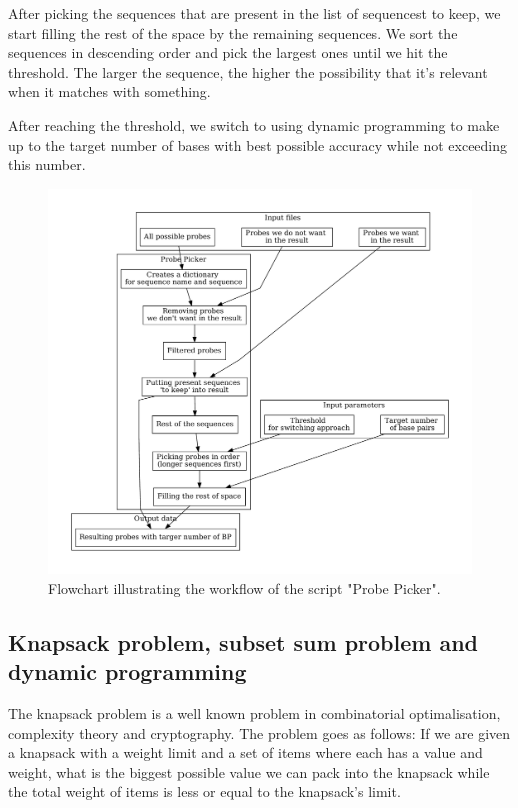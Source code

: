 After picking the sequences that are present in the list of sequencest to keep, we start filling the rest of the space by the remaining sequences. We sort the 
sequences in descending order and pick the largest ones until we hit the threshold. The larger the sequence, the higher the possibility that it's relevant 
when it matches with something. 

After reaching the threshold, we switch to using dynamic programming to make up to the target number of bases with best possible accuracy while not exceeding this 
number. 

\begin{figure}
\centerline{
	\includegraphics[width=1\textwidth]{graphs/probe_picker_workflow}
}
\caption[Workflow of Probe Picker script]{Flowchart illustrating the workflow of the script "Probe Picker".}
\label{obr:probe_picker}
\end{figure}


\subsection{Knapsack problem, subset sum problem and dynamic programming}
The knapsack problem is a well known problem in combinatorial optimalisation, complexity theory and cryptography. The problem goes as follows: If we are given a knapsack with a weight limit and a 
set of items where each has a value and weight, what is the biggest possible value we can pack into the knapsack while the total weight of items is less or equal to 
the knapsack's limit. 

